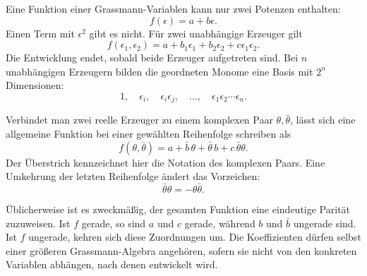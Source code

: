 Eine Funktion einer Grassmann-Variablen kann nur zwei Potenzen enthalten:
\begin{equation}
f(\epsilon)=a+b\epsilon.
\end{equation}
Einen Term mit \(\epsilon^2\) gibt es nicht. Für zwei unabhängige Erzeuger gilt
\begin{equation}
f(\epsilon_1,\epsilon_2)
=a+b_1\epsilon_1+b_2\epsilon_2+c\epsilon_1\epsilon_2.
\end{equation}
Die Entwicklung endet, sobald beide Erzeuger aufgetreten sind. Bei \(n\) unabhängigen Erzeugern bilden die geordneten Monome eine Basis mit \(2^n\) Dimensionen:
\begin{equation}
1,\quad
\epsilon_i,\quad
\epsilon_i\epsilon_j,\quad
\ldots,\quad
\epsilon_1\epsilon_2\cdots\epsilon_n.
\end{equation}

Verbindet man zwei reelle Erzeuger zu einem komplexen Paar \(\theta,\bar\theta\), lässt sich eine allgemeine Funktion bei einer gewählten Reihenfolge schreiben als
\begin{equation}
f(\theta,\bar\theta)
=a+\bar b\,\theta+\bar\theta\,b+c\,\bar\theta\theta.
\end{equation}
Der Überstrich kennzeichnet hier die Notation des komplexen Paars. Eine Umkehrung der letzten Reihenfolge ändert das Vorzeichen:
\begin{equation}
\bar\theta\theta=-\theta\bar\theta.
\end{equation}

Üblicherweise ist es zweckmäßig, der gesamten Funktion eine eindeutige Parität zuzuweisen. Ist \(f\) gerade, so sind \(a\) und \(c\) gerade, während \(b\) und \(\bar b\) ungerade sind. Ist \(f\) ungerade, kehren sich diese Zuordnungen um. Die Koeffizienten dürfen selbst einer größeren Grassmann-Algebra angehören, sofern sie nicht von den konkreten Variablen abhängen, nach denen entwickelt wird.

\begin{classroomqa}
\end{classroomqa}

